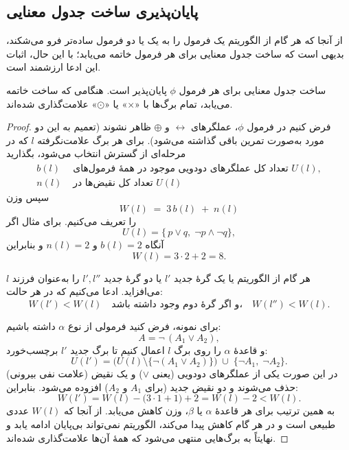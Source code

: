  \subsection*{ پایان‌پذیری ساخت جدول معنایی}

    از آنجا که هر گام از الگوریتم یک فرمول را به یک یا دو فرمول ساده‌تر فرو می‌شکند، بدیهی است که ساخت جدول معنایی برای هر فرمول خاتمه می‌یابد؛ با این حال، اثبات این ادعا ارزشمند است.
    
    \begin{theorem}[قضیه \lr{2.66}]
      ساخت جدول معنایی برای هر فرمول $\phi$ پایان‌پذیر است. هنگامی که ساخت خاتمه می‌یابد، تمام برگ‌ها با «$\times$» یا «$\odot$» علامت‌گذاری شده‌اند.
    \end{theorem}
    
    \begin{proof}
      فرض کنیم در فرمول $\phi$، عملگرهای $\leftrightarrow$ و $\oplus$ ظاهر نشوند (تعمیم به این دو مورد به‌صورت تمرین باقی گذاشته می‌شود).  
      برای هر برگ علامت‌نگرفته $l$ که در مرحله‌ای از گسترش انتخاب می‌شود، بگذارید
      \begin{align*}
      b(l) &\text{ تعداد کل عملگرهای دودویی موجود در همهٔ فرمول‌های }U(l),\\
      n(l) &\text{ تعداد کل نقیض‌ها در }U(l)
      \end{align*}
      سپس وزن
      \[
      W(l) \;=\; 3\,b(l) \;+\; n(l)
      \]
      را تعریف می‌کنیم.  
      برای مثال اگر
      \[
      U(l) = \{\,p \lor q,\;\neg p \land \neg q\},
      \]
      آنگاه $b(l)=2$ و $n(l)=2$ و بنابراین
      \[
      W(l) = 3\cdot 2 + 2 = 8.
      \]

      هر گام از الگوریتم یا یک گرهٔ جدید $l'$ یا دو گرهٔ جدید $l',l''$ را به‌عنوان فرزند $l$ می‌افزاید. ادعا می‌کنیم که در هر حالت:
      \[
      W(l') < W(l)
      \quad\text{و اگر گرهٔ دوم وجود داشته باشد،}\quad
      W(l'') < W(l).
      \]

      برای نمونه، فرض کنید فرمولی از نوع $\alpha$ داشته باشیم:
      \[
      A = \neg\,(A_1 \lor A_2),
      \]
      و قاعدهٔ $\alpha$ را روی برگ $l$ اعمال کنیم تا برگ جدید $l'$ برچسب‌خورد:
      \[
      U(l') = \bigl(U(l)\setminus\{\neg(A_1\lor A_2)\}\bigr)
      \;\cup\;\{\neg A_1,\;\neg A_2\}.
      \]
      در این صورت یکی از عملگرهای دودویی (یعنی $\lor$) و یک نقیض (علامت نفی بیرونی) حذف می‌شوند و دو نقیض جدید (برای $A_1$ و $A_2$) افزوده می‌شود. بنابراین:
      \[
      W(l') = W(l) - \bigl(3\cdot 1 + 1\bigr) + 2
      = W(l) - 2 < W(l).
      \]
      به همین ترتیب برای هر قاعدهٔ $\alpha$ یا $\beta$، وزن کاهش می‌یابد. از آنجا که $W(l)$ عددی طبیعی است و در هر گام کاهش پیدا می‌کند، الگوریتم نمی‌تواند بی‌پایان ادامه یابد و نهایتاً به برگ‌هایی منتهی می‌شود که همهٔ آن‌ها علامت‌گذاری شده‌اند.
    \end{proof}
